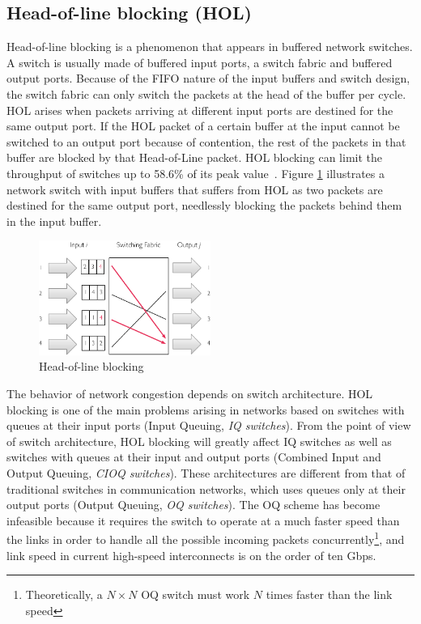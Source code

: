 \documentclass[12pt]{article}
\begin{document}
\subsection{Head-of-line blocking (HOL)}\label{S:hol_blocking} Head-of-line blocking is a phenomenon that appears in buffered network switches. A switch is usually made of buffered input ports, a switch fabric and buffered output ports. Because of the FIFO nature of the input buffers and switch design, the switch fabric can only switch the packets at the head of the buffer per cycle. HOL arises when packets arriving at different input ports are destined for the same output port. If the HOL packet of a certain buffer at the input cannot be switched to an output port because of contention, the rest of the packets in that buffer are blocked by that Head-of-Line packet. HOL blocking can limit the throughput of switches up to 58.6\% of its peak value~\cite{hol_thoughput}. Figure \ref{fig:hol} illustrates a network switch with input buffers that suffers from HOL as two packets are destined for the same output port, needlessly blocking the packets behind them in the input buffer.

\begin{figure}[ht]
	\centering
		\includegraphics[width=0.50\textwidth]{hol_blocking.pdf}
		\caption{Head-of-line blocking}
		\label{fig:hol}
\end{figure}

The behavior of network congestion depends on switch architecture. HOL blocking is one of the main problems arising in networks based on switches with queues at their input ports (Input Queuing, \emph{IQ switches}). From the point of view of switch architecture, HOL blocking will greatly affect IQ switches as well as switches with queues at their input and output ports (Combined Input and Output Queuing, \emph{CIOQ switches}). These architectures are different from that of traditional switches in communication networks, which uses queues only at their output ports (Output Queuing, \emph{OQ switches}). The OQ scheme has become infeasible because it requires the switch to operate at a much faster speed than the links in order to handle all the possible incoming packets concurrently\footnote{Theoretically, a ${N \times N}$ OQ switch must work ${N}$ times faster than the link speed}, and link speed in current high-speed interconnects is on the order of ten Gbps. 
\end{document}
